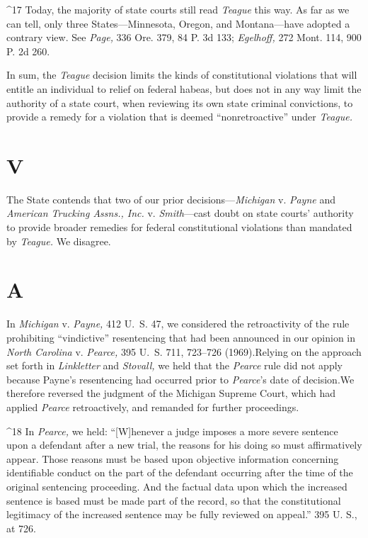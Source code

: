 {{{^17 Today, the majority of state courts still read \emph{Teague} this
way. As far as we can tell, only three States---Minnesota, Oregon, and
Montana---have adopted a contrary view. See \emph{Page,} 336 Ore. 379, 84
P. 3d 133; \emph{Egelhoff,} 272 Mont. 114, 900 P. 2d 260.

  In sum, the \emph{Teague} decision limits the kinds of constitutional
violations that will entitle an individual to relief on federal habeas,
but does not in any way limit the authority of a state court, when
reviewing its own state criminal convictions, to provide a remedy for a
violation that is deemed ``nonretroactive'' under \emph{Teague.}

\section{V}

  The State contends that two of our prior decisions---\emph{Michigan} v.
\emph{Payne} and \emph{American Trucking Assns., Inc.} v. \emph{Smith}---cast
doubt on state courts' authority to provide broader remedies for
federal constitutional violations than mandated by \emph{Teague.} We
disagree.

\section{A}

  In \emph{Michigan} v. \emph{Payne,} 412 U.~S. 47, we considered the
retroactivity of the rule prohibiting ``vindictive'' resentencing that
had been announced in our opinion in \emph{North Carolina} v. \emph{Pearce,}
395 U.~S. 711, 723--726 (1969).\footnotemark[18] Relying on the \newpage 
approach set forth in \emph{Linkletter} and \emph{Stovall,} we held that
the \emph{Pearce} rule did not apply because Payne's resentencing had
occurred prior to \emph{Pearce}'s date of decision.\footnotemark[19] We therefore
reversed the judgment of the Michigan Supreme Court, which had applied
\emph{Pearce} retroactively, and remanded for further proceedings.

^18 In \emph{Pearce,} we held: ``[W]henever a judge imposes a more severe
sentence upon a defendant after a new trial, the reasons for his doing
so must affirmatively appear. Those reasons must be based upon objective
information concerning identifiable conduct on the part of the defendant
occurring after the time of the original sentencing proceeding. And
the factual data upon which the increased sentence is based must be
made part of the record, so that the constitutional legitimacy of the
increased sentence may be fully reviewed on appeal.'' 395 U. S., at
726.

}}}
